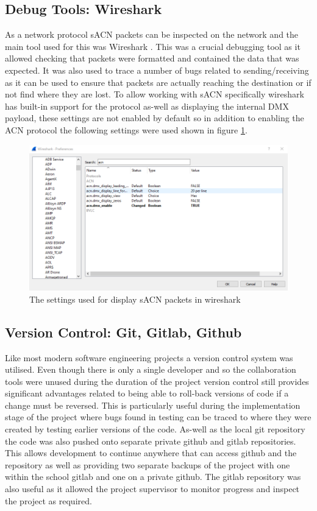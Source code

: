 \documentclass[11pt,a4paper]{article}
\begin{document}
\subsection{Debug Tools: Wireshark}
As a network protocol sACN packets can be inspected on the network and the main tool used for this was Wireshark \cite{WIRESHARK}. This was a crucial debugging tool as it allowed checking that packets were formatted and contained the data that was expected. It was also used to trace a number of bugs related to sending/receiving as it can be used to ensure that packets are actually reaching the destination or if not find where they are lost.  To allow working with sACN specifically wireshark has built-in support for the protocol as-well as displaying the internal DMX payload, these settings are not enabled by default so in addition to enabling the ACN protocol the following settings were used shown in figure \ref{WIRESHARK_SETTINGS}.

\begin{figure}[H]
	\includegraphics[width=\textwidth]{wireshark-settings}
	\caption{The settings used for display sACN packets in wireshark}
	\label{WIRESHARK_SETTINGS}
\end{figure}

\subsection{Version Control: Git, Gitlab, Github}
Like most modern software engineering projects a version control system was utilised. Even though there is only a single developer and so the collaboration tools were unused during the duration of the project version control still provides significant advantages related to being able to roll-back versions of code if a change must be reversed. This is particularly useful during the implementation stage of the project where bugs found in testing can be traced to where they were created by testing earlier versions of the code. As-well as the local git repository the code was also pushed onto separate private github and gitlab repositories. This allows development to continue anywhere that can access github and the repository as well as providing two separate backups of the project with one within the school gitlab and one on a private github. The gitlab repository was also useful as it allowed the project supervisor to monitor progress and inspect the project as required.
\end{document}
